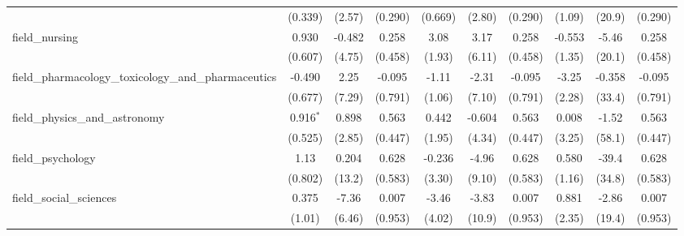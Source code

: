 \begin{tabular}{lccccccccc}
                                                               & (0.339)        & (2.57)         & (0.290)        & (0.669)        & (2.80)        & (0.290)        & (1.09)         & (20.9)         & (0.290)\\   
   field\_nursing                                              & 0.930          & -0.482         & 0.258          & 3.08           & 3.17          & 0.258          & -0.553         & -5.46          & 0.258\\   
                                                               & (0.607)        & (4.75)         & (0.458)        & (1.93)         & (6.11)        & (0.458)        & (1.35)         & (20.1)         & (0.458)\\   
   field\_pharmacology\_toxicology\_and\_pharmaceutics         & -0.490         & 2.25           & -0.095         & -1.11          & -2.31         & -0.095         & -3.25          & -0.358         & -0.095\\   
                                                               & (0.677)        & (7.29)         & (0.791)        & (1.06)         & (7.10)        & (0.791)        & (2.28)         & (33.4)         & (0.791)\\   
   field\_physics\_and\_astronomy                              & 0.916$^{*}$    & 0.898          & 0.563          & 0.442          & -0.604        & 0.563          & 0.008          & -1.52          & 0.563\\   
                                                               & (0.525)        & (2.85)         & (0.447)        & (1.95)         & (4.34)        & (0.447)        & (3.25)         & (58.1)         & (0.447)\\   
   field\_psychology                                           & 1.13           & 0.204          & 0.628          & -0.236         & -4.96         & 0.628          & 0.580          & -39.4          & 0.628\\   
                                                               & (0.802)        & (13.2)         & (0.583)        & (3.30)         & (9.10)        & (0.583)        & (1.16)         & (34.8)         & (0.583)\\   
   field\_social\_sciences                                     & 0.375          & -7.36          & 0.007          & -3.46          & -3.83         & 0.007          & 0.881          & -2.86          & 0.007\\   
                                                               & (1.01)         & (6.46)         & (0.953)        & (4.02)         & (10.9)        & (0.953)        & (2.35)         & (19.4)         & (0.953)\\   

\end{tabular}
